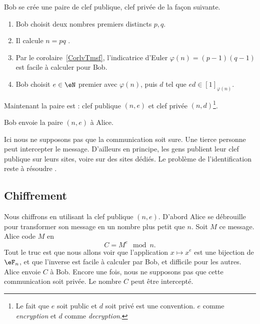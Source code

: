 Bob se crée une paire de clef publique, clef privée de la façon suivante.
\begin{enumerate}
	\item
	      Bob choisit deux nombres premiers distincts \( p,q\).
	\item
	      Il calcule \( n=pq\) .
	\item
	      Par le corolaire~\ref{CorlvTmsf}, l'indicatrice d'Euler \( \varphi(n)=(p-1)(q-1)\) est facile à calculer pour Bob.
	\item
	      Bob choisit \( e\in \eN\) premier avec \( \varphi(n)\), puis \( d\) tel que \( ed\in[1]_{\varphi(n)}\).
\end{enumerate}
Maintenant la paire est : clef publique \( (n,e)\) et clef privée \( (n,d)\)\footnote{Le fait que \( e\) soit public et \( d\) soit privé est une convention. \( e\) comme  \emph{encryption} et \( d\) comme \emph{decryption}.}.

Bob envoie la paire \( (n,e)\) à Alice.

\begin{remark}
	Ici nous ne supposons pas que la communication soit sure. Une tierce personne peut intercepter le message. D'ailleurs en principe, les gens publient leur clef publique sur leurs sites, voire sur des sites dédiés. Le problème de l'identification reste à résoudre .
\end{remark}

\subsection{Chiffrement}

Nous chiffrons en utilisant la clef publique \( (n,e)\). D'abord Alice se débrouille pour transformer son message en un nombre plus petit que \( n\). Soit \( M\) ce message. Alice code \( M\) en
\begin{equation}
	C=M^e\mod n.
\end{equation}
Tout le truc est que nous allons voir que l'application \( x\mapsto x^e\) est une bijection de \( \eF_n\), et que l'inverse est facile à calculer par Bob, et difficile pour les autres. Alice envoie \( C\) à Bob. Encore une fois, nous ne supposons pas que cette communication soit privée. Le nombre \( C\) peut être intercepté.

